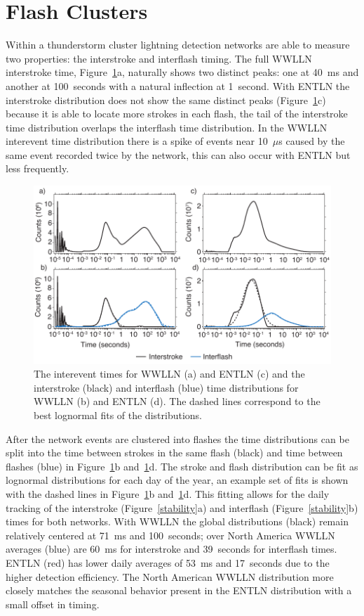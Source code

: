 \section{Flash Clusters}
\label{sec:interflash}

Within a thunderstorm cluster lightning detection networks are able to measure two properties: the interstroke and interflash timing.
The full WWLLN interstroke time, Figure~\ref{interflash}a, naturally shows two distinct peaks: one at 40~ms and another at 100~seconds with a natural inflection at 1~second.
With ENTLN the interstroke distribution does not show the same distinct peaks (Figure~\ref{interflash}c) because it is able to locate more strokes in each flash, the tail of the interstroke time distribution overlaps the interflash time distribution.
In the WWLLN interevent time distribution there is a spike of events near 10~$\mu$s caused by the same event recorded twice by the network, this can also occur with ENTLN but less frequently.

\begin{figure}[ht!]
   \centering
   \includegraphics[scale=1]{thunderstorm/Figures/interflash.pdf}
   \caption{The interevent times for WWLLN (a) and ENTLN (c) and the interstroke (black) and interflash (blue) time distributions for WWLLN (b) and ENTLN (d).
           The dashed lines correspond to the best lognormal fits of the distributions.}
   \label{interflash}
\end{figure}

After the network events are clustered into flashes the time distributions can be split into the time between strokes in the same flash (black) and time between flashes (blue) in Figure~\ref{interflash}b and~\ref{interflash}d.
The stroke and flash distribution can be fit as lognormal distributions for each day of the year, an example set of fits is shown with the dashed lines in Figure~\ref{interflash}b and~\ref{interflash}d.
This fitting allows for the daily tracking of the interstroke (Figure~\ref{stability}a) and interflash (Figure~\ref{stability}b) times for both networks.
With WWLLN the global distributions (black) remain relatively centered at 71~ms and 100~seconds; over North America WWLLN averages (blue) are 60~ms for interstroke and 39~seconds for interflash times.
ENTLN (red) has lower daily averages of 53~ms and 17~seconds due to the higher detection efficiency.
The North American WWLLN distribution more closely matches the seasonal behavior present in the ENTLN distribution with a small offset in timing.

